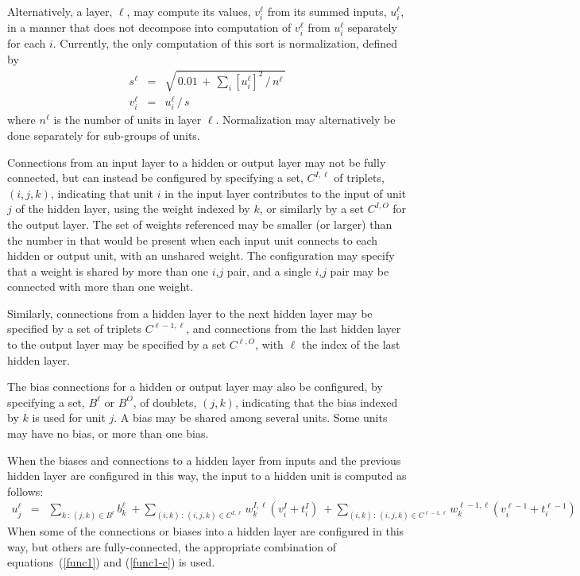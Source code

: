 \documentclass{report}[11pt]
\def\beq{\begin{eqnarray}}
\def\eeq{\end{eqnarray}}
\begin{document}
Alternatively, a layer, $\ell$, may compute its values, $v^{\ell}_i$
from its summed inputs, $u^{\ell}_i$, in a manner that does not
decompose into computation of $v^{\ell}_i$ from $u^{\ell}_i$
separately for each $i$.  Currently, the only computation of this
sort is normalization, defined by\vspace{-5pt}
\beq
 s^{\ell} & = & \textstyle 
   \sqrt{\,0.01\,+\,\sum\nolimits_i [u^{\ell}_i]^2\,/\,n^{\ell}\,} 
   \label{defs}\\[3pt]
 v^{\ell}_i & = & u^{\ell}_i\,/\,s
\eeq
where $n^{\ell}$ is the number of units in layer $\ell$.  Normalization
may alternatively be done separately for sub-groups of units.

Connections from an input layer to a hidden or output layer may not be
fully connected, but can instead be configured by specifying a set,
$C^{I,\ell}$ of triplets, $(i,j,k)$, indicating that unit $i$ in the
input layer contributes to the input of unit $j$ of the hidden layer,
using the weight indexed by $k$, or similarly by a set $C^{I,O}$ for
the output layer.  The set of weights referenced may be smaller (or
larger) than the number in that would be present when each input unit
connects to each hidden or output unit, with an unshared weight.  The
configuration may specify that a weight is shared by more than one
$i$,$j$ pair, and a single $i$,$j$ pair may be connected with more
than one weight.  

Similarly, connections from a hidden layer to the next hidden layer
may be specified by a set of triplets $C^{\ell\!-\!1,\ell}$, and
connections from the last hidden layer to the output layer may be
specified by a set $C^{\ell,O}$, with $\ell$ the index of the last
hidden layer.

The bias connections for a hidden or output layer may also be
configured, by specifying a set, $B^{\ell}$ or $B^O$, of doublets,
$(j,k)$, indicating that the bias indexed by $k$ is used for unit $j$.
A bias may be shared among several units. Some units may have no bias,
or more than one bias.

When the biases and connections to a hidden layer from inputs and the
previous hidden layer are configured in this way, the input to a hidden
unit is computed as follows:
\beq
  u^{\ell}_j & = & 
         \sum_{k\,:\, (j,k)\in B^{\ell}}\!\!\!\!\!\!
                        b^{\ell}_k \ +\!\!\!
         \sum_{(i,k)\,:\, (i,j,k)\in C^{I,\ell}}\!\!\!\!\!\!
                        w^{I,\ell}_k (v^I_i+t^I_i) \ +\!\!\!
         \sum_{(i,k)\,:\, (i,j,k)\in C^{\ell\!-\!1,\ell}}\!\!\!\!\!\!
               w^{\ell-1,\ell}_k (v^{\ell-1}_i+t^{\ell-1}_i)
\label{func1-c}\eeq%
When some of the connections or biases into a hidden layer are
configured in this way, but others are fully-connected, the
appropriate combination of equations~(\ref{func1}) and (\ref{func1-c})
is used.
\end{document}
